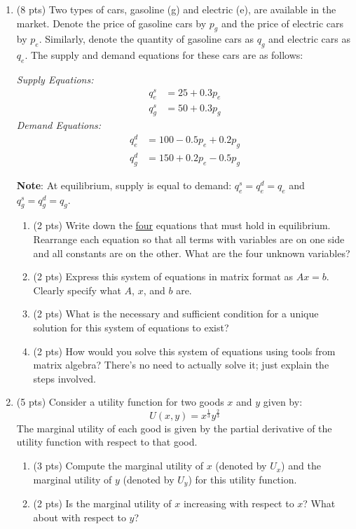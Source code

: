 \documentclass{./../../../Latex/tests}
\begin{document}
\begin{enumerate}
\begin{enumerate}
\end{enumerate}

\newpage
\item (8 pts) Two types of cars, gasoline (g) and electric (e), are available in the market. Denote the price of gasoline cars by \(p_g\) and the price of electric cars by \(p_e\). Similarly, denote the quantity of gasoline cars as \(q_g\) and electric cars as \(q_e\). The supply and demand equations for these cars are as follows:

\textit{Supply Equations:}
\begin{align*}
q^s_e &= 25 + 0.3p_e \\
q^s_g &= 50 + 0.3p_g
\end{align*}
\textit{Demand Equations:}
\begin{align*}
q^d_e &= 100 - 0.5p_e + 0.2p_g \\
q^d_g &= 150 + 0.2p_e - 0.5p_g
\end{align*}

\textbf{Note}: At equilibrium, supply is equal to demand: \(q^s_e = q^d_e = q_e\) and \(q^s_g = q^d_g = q_g\).

\begin{enumerate}
\item (2 pts) Write down the \underline{four} equations that must hold in equilibrium. Rearrange each equation so that all terms with variables are on one side and all constants are on the other. What are the four unknown variables?

\newpage
\item (2 pts) Express this system of equations in matrix format as \(Ax = b\). Clearly specify what \(A\), \(x\), and \(b\) are.
\vspace{10cm}
\item (2 pts) What is the necessary and sufficient condition for a unique solution for this system of equations to exist?
\vspace{3cm}
\item (2 pts) How would you solve this system of equations using tools from matrix algebra? There's no need to actually solve it; just explain the steps involved.
\end{enumerate}


\newpage
\item (5 pts) Consider a utility function for two goods \( x \) and \( y \) given by:
\[
U(x, y) = x^{\frac{1}{3}}y^{\frac{2}{3}}
\]
The marginal utility of each good is given by the partial derivative of the utility function with respect to that good.
\begin{enumerate}
  \item (3 pts) Compute the marginal utility of \( x \) (denoted by \( U_x \)) and the marginal utility of \( y \) (denoted by \( U_y \)) for this utility function.
  \vspace{7cm}
  \item (2 pts) Is the marginal utility of \( x \) increasing with respect to \( x \)? What about with respect to \( y \)?
\end{enumerate}


\end{enumerate}
\end{document}
